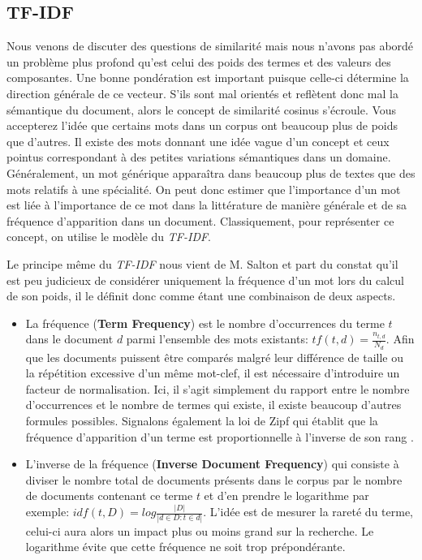 \subsection{TF-IDF}

Nous venons de discuter des questions de similarité mais nous n'avons pas abordé un problème plus profond qu'est celui des poids des termes et des valeurs des composantes. Une bonne pondération est important puisque celle-ci détermine la direction générale de ce vecteur. S'ils sont mal orientés et reflètent donc mal la sémantique du document, alors le concept de similarité cosinus s'écroule. Vous accepterez l'idée que certains mots dans un corpus ont beaucoup plus de poids que d'autres. Il existe des mots donnant une idée vague d'un concept et ceux pointus correspondant à des petites variations sémantiques dans un domaine. Généralement, un mot générique apparaîtra dans beaucoup plus de textes que des mots relatifs à une spécialité. On peut donc estimer que l'importance d'un mot est liée à l'importance de ce mot dans la littérature de manière générale et de sa fréquence d'apparition dans un document. Classiquement, pour représenter ce concept, on utilise le modèle du \textit{TF-IDF}.

Le principe même du \textit{TF-IDF} nous vient de M. Salton \cite{salton1988term} et part du constat qu'il est peu judicieux de considérer uniquement la fréquence d'un mot lors du calcul de son poids, il le définit donc comme étant une combinaison de deux aspects.
\begin{itemize}
  \item La fréquence (\textbf{Term Frequency}) \cite{Luhn:1957:SAM:1661832.1661836} est le nombre d’occurrences du terme $t$ dans le document $d$ parmi l'ensemble des mots existants: $tf(t, d) = \frac{n_{t, d}}{N_d}$. Afin que les documents puissent être comparés malgré leur différence de taille ou la répétition excessive d'un même mot-clef, il est nécessaire d'introduire un facteur de normalisation. Ici, il s'agit simplement du rapport entre le nombre d'occurrences et le nombre de termes qui existe, il existe beaucoup d'autres formules possibles. Signalons également la loi de Zipf qui établit que la fréquence d'apparition d'un terme est proportionnelle à l'inverse de son rang \cite{zipf1932selected}.
  \item L'inverse de la fréquence (\textbf{Inverse Document Frequency}) \cite{Jones72astatistical} qui consiste à diviser le nombre total de documents présents dans le corpus par le nombre de documents contenant ce terme $t$ et d'en prendre le logarithme par exemple: $idf(t, D) = log \frac{|D|}{|{d \in D: t \in d}|} $. L'idée est de mesurer la rareté du terme, celui-ci aura alors un impact plus ou moins grand sur la recherche. Le logarithme évite que cette fréquence ne soit trop prépondérante. 
\end{itemize}

